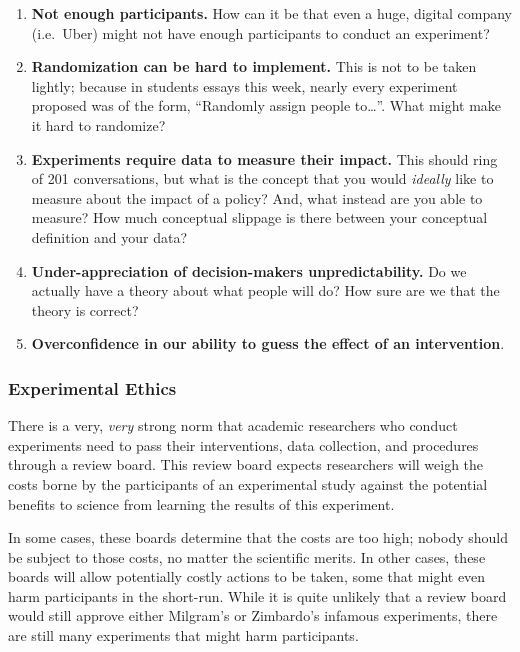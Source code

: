 \documentclass[
]{article}
\providecommand{\tightlist}{%
  \setlength{\itemsep}{0pt}\setlength{\parskip}{0pt}}
\begin{document}
\begin{enumerate}
\def\labelenumi{\arabic{enumi}.}
\tightlist
\item
  \textbf{Not enough participants.} How can it be that even a huge, digital company (i.e.~Uber) might not have enough participants to conduct an experiment?
\item
  \textbf{Randomization can be hard to implement.} This is not to be taken lightly; because in students essays this week, nearly every experiment proposed was of the form, ``Randomly assign people to\ldots{}''. What might make it hard to randomize?
\item
  \textbf{Experiments require data to measure their impact.} This should ring of 201 conversations, but what is the concept that you would \emph{ideally} like to measure about the impact of a policy? And, what instead are you able to measure? How much conceptual slippage is there between your conceptual definition and your data?\\
\item
  \textbf{Under-appreciation of decision-makers unpredictability.} Do we actually have a theory about what people will do? How sure are we that the theory is correct?\\
\item
  \textbf{Overconfidence in our ability to guess the effect of an intervention}.
\end{enumerate}

\hypertarget{experimental-ethics}{%
\subsubsection{Experimental Ethics}\label{experimental-ethics}}

There is a very, \emph{very} strong norm that academic researchers who conduct experiments need to pass their interventions, data collection, and procedures through a review board. This review board expects researchers will weigh the costs borne by the participants of an experimental study against the potential benefits to science from learning the results of this experiment.

In some cases, these boards determine that the costs are too high; nobody should be subject to those costs, no matter the scientific merits. In other cases, these boards will allow potentially costly actions to be taken, some that might even harm participants in the short-run. While it is quite unlikely that a review board would still approve either Milgram's or Zimbardo's infamous experiments, there are still many experiments that might harm participants.
\end{document}
